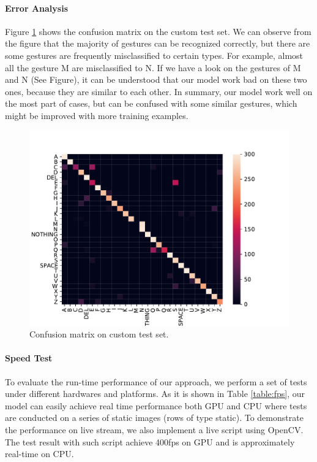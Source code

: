 \documentclass[10pt,twocolumn,letterpaper]{article}
\begin{document}
\paragraph{Error Analysis} Figure \ref{fig:confusion} shows the confusion matrix on the custom test set. We can observe from the figure that the majority of gestures can be recognized correctly, but there are some gestures are frequently misclassified to certain types. For example, almost all the gesture M are misclassified to N. If we have a look on the gestures of M and N (See Figure), it can be understood that our model work bad on these two ones, because they are similar to each other. In summary, our model work well on the most part of cases, but can be confused with some similar gestures, which might be improved with more training examples.


\begin{figure}[h]
\begin{center}
\includegraphics[width=1\linewidth]{imgs/confusion}
\end{center}
   \caption{Confusion matrix on custom test set.}
\label{fig:confusion}
\end{figure}

\paragraph{Speed Test}
To evaluate the run-time performance of our approach, we perform a set of tests under different hardwares and platforms. As it is shown in Table \ref{table:fps}, our model can easily achieve real time performance both GPU and CPU where tests are conducted on a series of static images (rows of type static). To demonstrate the performance on live stream, we also implement a live script using OpenCV. The test result with such script achieve 400fps on GPU and is approximately real-time on CPU.  
\end{document}
